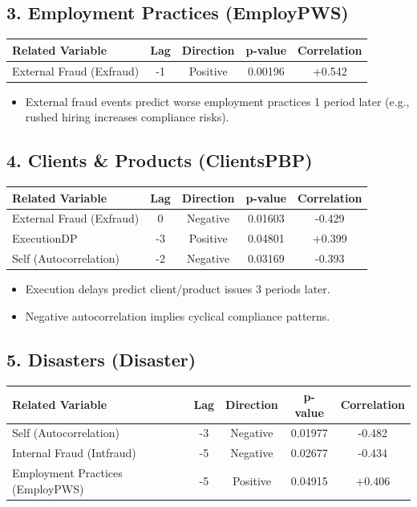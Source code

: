 \subsection*{3. Employment Practices (EmployPWS)}
\begin{tabular}{lcccc}
\toprule
Related Variable & Lag & Direction & p-value & Correlation \\
\midrule
External Fraud (Exfraud) & -1 & Positive & 0.00196 & +0.542 \\
\bottomrule
\end{tabular}

\begin{itemize}
\item External fraud events predict worse employment practices 1 period later (e.g., rushed hiring increases compliance risks).
\end{itemize}

\subsection*{4. Clients \& Products (ClientsPBP)}
\begin{tabular}{lcccc}
\toprule
Related Variable & Lag & Direction & p-value & Correlation \\
\midrule
External Fraud (Exfraud) & 0 & Negative & 0.01603 & -0.429 \\
ExecutionDP & -3 & Positive & 0.04801 & +0.399 \\
Self (Autocorrelation) & -2 & Negative & 0.03169 & -0.393 \\
\bottomrule
\end{tabular}

\begin{itemize}
\item Execution delays predict client/product issues 3 periods later.
\item Negative autocorrelation implies cyclical compliance patterns.
\end{itemize}

\subsection*{5. Disasters (Disaster)}
\begin{tabular}{lcccc}
\toprule
Related Variable & Lag & Direction & p-value & Correlation \\
\midrule
Self (Autocorrelation) & -3 & Negative & 0.01977 & -0.482 \\
Internal Fraud (Intfraud) & -5 & Negative & 0.02677 & -0.434 \\
Employment Practices (EmployPWS) & -5 & Positive & 0.04915 & +0.406 \\
\bottomrule
\end{tabular}

